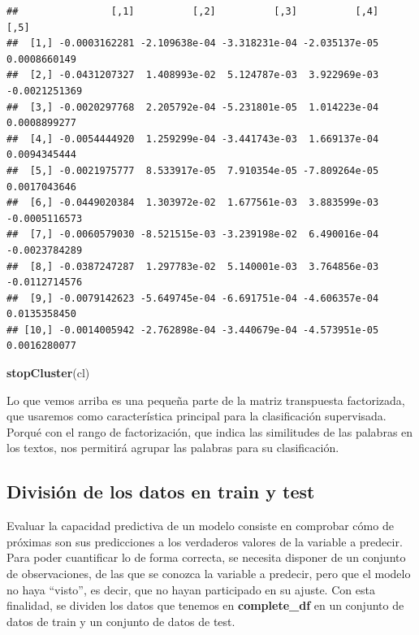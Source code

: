 \documentclass[]{article}
\newenvironment{Shaded}{\begin{snugshade}}{\end{snugshade}}
\newcommand{\KeywordTok}[1]{\textcolor[rgb]{0.13,0.29,0.53}{\textbf{#1}}}
\newcommand{\NormalTok}[1]{#1}
\begin{document}
\begin{verbatim}
##                [,1]          [,2]          [,3]          [,4]          [,5]
##  [1,] -0.0003162281 -2.109638e-04 -3.318231e-04 -2.035137e-05  0.0008660149
##  [2,] -0.0431207327  1.408993e-02  5.124787e-03  3.922969e-03 -0.0021251369
##  [3,] -0.0020297768  2.205792e-04 -5.231801e-05  1.014223e-04  0.0008899277
##  [4,] -0.0054444920  1.259299e-04 -3.441743e-03  1.669137e-04  0.0094345444
##  [5,] -0.0021975777  8.533917e-05  7.910354e-05 -7.809264e-05  0.0017043646
##  [6,] -0.0449020384  1.303972e-02  1.677561e-03  3.883599e-03 -0.0005116573
##  [7,] -0.0060579030 -8.521515e-03 -3.239198e-02  6.490016e-04 -0.0023784289
##  [8,] -0.0387247287  1.297783e-02  5.140001e-03  3.764856e-03 -0.0112714576
##  [9,] -0.0079142623 -5.649745e-04 -6.691751e-04 -4.606357e-04  0.0135358450
## [10,] -0.0014005942 -2.762898e-04 -3.440679e-04 -4.573951e-05  0.0016280077
\end{verbatim}

\begin{Shaded}
\begin{Highlighting}[]
\KeywordTok{stopCluster}\NormalTok{(cl)}
\end{Highlighting}
\end{Shaded}

Lo que vemos arriba es una pequeña parte de la matriz transpuesta factorizada, que usaremos como
característica principal para la clasificación supervisada. Porqué con el rango de factorización, que indica las similitudes de las palabras en los textos, nos permitirá agrupar las palabras para su clasificación.

\hypertarget{divisiuxf3n-de-los-datos-en-train-y-test}{%
\subsection{División de los datos en train y
test}\label{divisiuxf3n-de-los-datos-en-train-y-test}}

Evaluar la capacidad predictiva de un modelo consiste en comprobar cómo
de próximas son sus predicciones a los verdaderos valores de la variable
a predecir. Para poder cuantificar lo de forma correcta, se
necesita disponer de un conjunto de observaciones, de las que se conozca
la variable a predecir, pero que el modelo no haya ``visto'', es decir,
que no hayan participado en su ajuste. Con esta finalidad, se dividen
los datos que tenemos en \textbf{complete\_df} en un conjunto de datos de 
train y un conjunto de datos de test.
\end{document}
